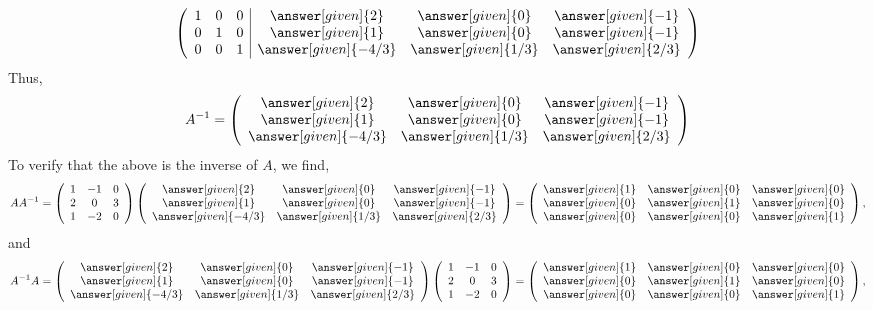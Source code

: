 \documentclass{ximera}
\begin{document}
\begin{example}
\begin{prompt}
\[\left(\begin{array}{ccc|ccc}
  1 &  0 & 0 & \answer[given]{2}  &\answer[given]{0}  &\answer[given]{-1}  \\
  0 &  1 &0& \answer[given]{1}  & \answer[given]{0} &\answer[given]{-1} \\
  0 & 0 & 1&\answer[given]{-4/3}   &\answer[given]{1/3}  &\answer[given]{2/3}
\end{array}\right)
\]
Thus,
\[A^{-1}= \left(\begin{array}{ccc}
  \answer[given]{2}  &\answer[given]{0}  &\answer[given]{-1}  \\
  \answer[given]{1}  & \answer[given]{0} &\answer[given]{-1} \\
 \answer[given]{-4/3}   &\answer[given]{1/3}  &\answer[given]{2/3}
\end{array}\right)\]
To verify that the above is the inverse of $A$, we find,
\[AA^{-1}=\left(\begin{array}{ccc}
   1  &-1  &0 \\
   2  & 0 &3 \\
  1   &-2 &0
\end{array}\right)\left(\begin{array}{ccc}
   \answer[given]{2}  &\answer[given]{0}  &\answer[given]{-1}  \\
   \answer[given]{1}  & \answer[given]{0} &\answer[given]{-1} \\
  \answer[given]{-4/3}   &\answer[given]{1/3}  &\answer[given]{2/3}
\end{array}\right)=\left(\begin{array}{ccc}
   \answer[given]{1}  &\answer[given]{0}  &\answer[given]{0}  \\
   \answer[given]{0}  & \answer[given]{1} &\answer[given]{0} \\
  \answer[given]{0}   &\answer[given]{0}  &\answer[given]{1}
\end{array}\right),
\]
and
 \[A^{-1}A=\left(\begin{array}{ccc}
   \answer[given]{2}  &\answer[given]{0}  &\answer[given]{-1}  \\
   \answer[given]{1}  & \answer[given]{0} &\answer[given]{-1} \\
  \answer[given]{-4/3}   &\answer[given]{1/3}  &\answer[given]{2/3}
\end{array}\right)\left(\begin{array}{ccc}
   1  &-1  &0 \\
   2  & 0 &3 \\
  1   &-2 &0
\end{array}\right)=\left(\begin{array}{ccc}
   \answer[given]{1}  &\answer[given]{0}  &\answer[given]{0}  \\
   \answer[given]{0}  & \answer[given]{1} &\answer[given]{0} \\
  \answer[given]{0}   &\answer[given]{0}  &\answer[given]{1}
\end{array}\right),
\]
\end{prompt}
\end{example}
\end{document}
